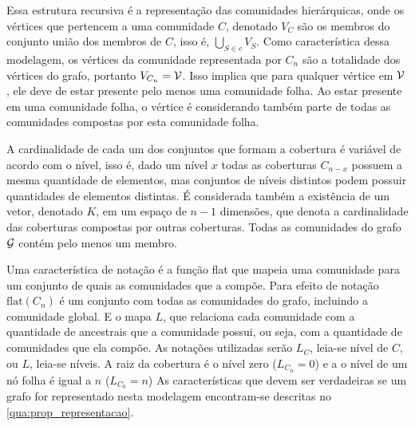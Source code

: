 \documentclass[notes.tex]{subfiles}
\begin{document}
Essa estrutura recursiva é a representação das comunidades hierárquicas, onde os vértices que pertencem a uma comunidade $C$, denotado $V_C$ são os membros do conjunto união dos membros de  $C$, isso é, $\bigcup_{S \in c} V_S$.
Como característica dessa modelagem, os vértices da comunidade representada por $C_n$ são a totalidade dos vértices do grafo, portanto $V_{C_n} = \operatorname{\mathcal{V}}$.
Isso implica que para qualquer vértice em $\operatorname{\mathcal{V}}$, ele deve de estar presente pelo menos uma comunidade folha.
Ao estar presente em uma comunidade folha, o vértice é considerando também parte de todas as comunidades compostas por esta comunidade folha.

A cardinalidade de cada um dos conjuntos que formam a cobertura é variável de acordo com o nível, isso é, dado um nível $x$ todas as coberturas  $C_{n-x}$ possuem a mesma quantidade de elementos, mas conjuntos de níveis distintos podem possuir quantidades de elementos distintas.
É considerada também a existência de um vetor, denotado $K$, em um espaço de $n-1$ dimensões, que denota a cardinalidade das coberturas compostas por outras coberturas.
Todas as comunidades do grafo $\operatorname{\mathcal{G}}$ contém pelo menos um membro.

Uma característica de notação é a função flat que mapeia uma comunidade para um conjunto de quais as comunidades que a compõe.
Para efeito de notação $\text{flat}(C_n)$ é um conjunto com todas as comunidades do grafo, incluindo a comunidade global.
E o mapa $L$, que relaciona cada comunidade com a quantidade de ancestrais que a comunidade possui, ou seja, com a quantidade de comunidades que ela compõe.
As notações utilizadas serão  $L_C$, leia-se nível de $C$, ou $L$, leia-se níveis.
A raiz da cobertura é o nível zero ($L_{C_n} = 0$) e a o nível de um nó folha é igual a $n$ ($L_{C_0}=n$)
As características que devem ser verdadeiras se um grafo for representado nesta modelagem encontram-se descritas no \autoref{qua:prop_representacao}.
\end{document}
